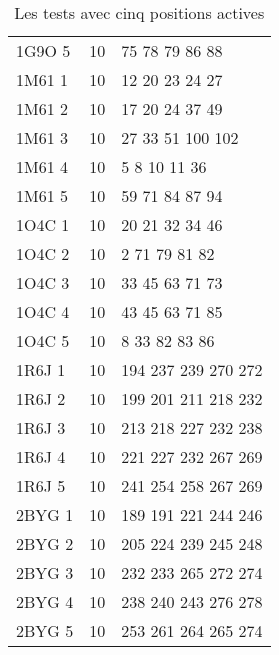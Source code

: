 \begin{table}[!htbp]
{\begin{tabular}{lll}
        1G9O 5 & 10 & 75 78 79 86 88 \\
        1M61 1 & 10 & 12 20 23 24 27 \\
        1M61 2 & 10 & 17 20 24 37 49 \\
        1M61 3 & 10 & 27 33 51 100 102 \\
        1M61 4 & 10 & 5 8 10 11 36 \\
        1M61 5 & 10 & 59 71 84 87 94 \\
        1O4C 1 & 10 & 20 21 32 34 46 \\
        1O4C 2 & 10 & 2 71 79 81 82 \\
        1O4C 3 & 10 & 33 45 63 71 73 \\
        1O4C 4 & 10 & 43 45 63 71 85 \\
        1O4C 5 & 10 & 8 33 82 83 86 \\
        1R6J 1 & 10 & 194 237 239 270 272 \\
        1R6J 2 & 10 & 199 201 211 218 232 \\
        1R6J 3 & 10 & 213 218 227 232 238 \\
        1R6J 4 & 10 & 221 227 232 267 269 \\
        1R6J 5 & 10 & 241 254 258 267 269 \\
        2BYG 1 & 10 & 189 191 221 244 246 \\
        2BYG 2 & 10 & 205 224 239 245 248 \\
        2BYG 3 & 10 & 232 233 265 272 274 \\
        2BYG 4 & 10 & 238 240 243 276 278 \\
        2BYG 5 & 10 & 253 261 264 265 274 \\

        \bottomrule

      \end{tabular}      
}
      \caption{Les tests avec cinq positions actives}
\label{tab:test5}      
    \end{table}


